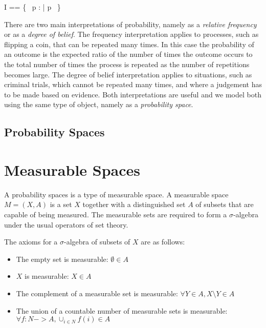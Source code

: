 \documentclass{article}
\begin{document}

\begin{zed}
	I == \{~ p : \real |  \realzero \realleq p \realleq \realone   ~\}
\end{zed}

There are two main interpretations of probability, namely as a {\it relative frequency} or as a {\it degree of belief}.
The frequency interpretation applies to processes, such as flipping a coin, that can be repeated many times.
In this case the probability of an outcome is the expected ratio of the number of times the outcome occurs to the total number of times the process is repeated as the number
of repetitions becomes large.
The degree of belief interpretation applies to situations, such as criminal trials, which cannot be repeated many times, and where a judgement has to be made based on evidence.
Both interpretations are useful and we model both using the same type of object, namely as a {\it probability space}.

\subsection{Probability Spaces}




\section{Measurable Spaces}

A probability spaces is a type of measurable space.
A measurable space $M =(X,A)$ is a set $X$ together with a distinguished set $A$ of subsets that are capable of being measured.
The measurable sets are required to form a $\sigma$-algebra under the usual operators of set theory.

The axioms for a $\sigma$-algebra of subsets of $X$ are as follows:
\begin{itemize}
\item The empty set is measurable: $\emptyset \in A$
\item $X$ is measurable: $X \in A$
\item The complement of a measurable set is measurable: $\forall Y \in A, X \setminus Y \in A$
\item The union of a countable number of measurable sets is measurable: $\forall f: N -> A, \cup_{i \in N} f(i) \in A$
\end{itemize}
\end{document}
